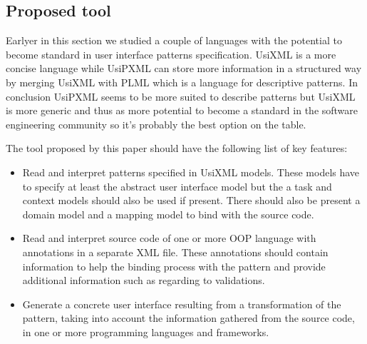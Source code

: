 \subsection{Proposed tool}
Earlyer in this section we studied a couple of languages with the potential to become standard in user interface patterns specification. UsiXML is a more concise language while UsiPXML can store more information in a structured way by merging UsiXML with PLML which is a language for descriptive patterns. In conclusion UsiPXML seems to be more suited to describe patterns but UsiXML is more generic and thus as more potential to become a standard in the software engineering community so it's probably the best option on the table.

The tool proposed by this paper should have the following list of key features:
\begin{itemize}
\item Read and interpret patterns specified in UsiXML models. These models have to specify at least the abstract user interface model but the a task and context models should also be used if present. There should also be present a domain model and a mapping model to bind with the source code.
\item Read and interpret source code of one or more OOP language with annotations in a separate XML file. These annotations should contain information to help the binding process with the pattern and provide additional information such as regarding to validations.
\item Generate a concrete user interface resulting from a transformation of the pattern, taking into account the information gathered from the source code, in one or more programming languages and frameworks.
\end{itemize}